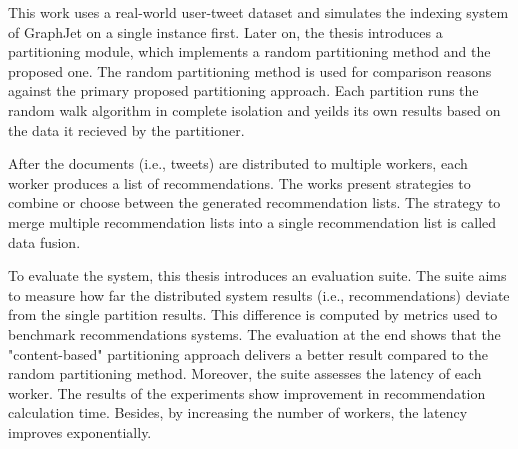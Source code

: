 This work uses a real-world user-tweet dataset and simulates the indexing system of GraphJet on a single instance first. Later on, the thesis introduces a partitioning module, which implements a random partitioning method and the proposed one. The random partitioning method is used for comparison reasons against the primary proposed partitioning approach. Each partition runs the random walk algorithm in complete isolation and yeilds its own results based on the data it recieved by the partitioner.


After the documents (i.e., tweets) are distributed to multiple workers, each worker produces a list of recommendations. The works present strategies to combine or choose between the generated recommendation lists. The strategy to merge multiple recommendation lists into a single recommendation list is called data fusion.


To evaluate the system, this thesis introduces an evaluation suite. The suite aims to measure how far the distributed system results (i.e., recommendations) deviate from the single partition results. This difference is computed by metrics used to benchmark recommendations systems. The evaluation at the end shows that the "content-based" partitioning approach delivers a better result compared to the random partitioning method. Moreover, the suite assesses the latency of each worker. The results of the experiments show improvement in recommendation calculation time. Besides, by increasing the number of workers, the latency improves exponentially.
 